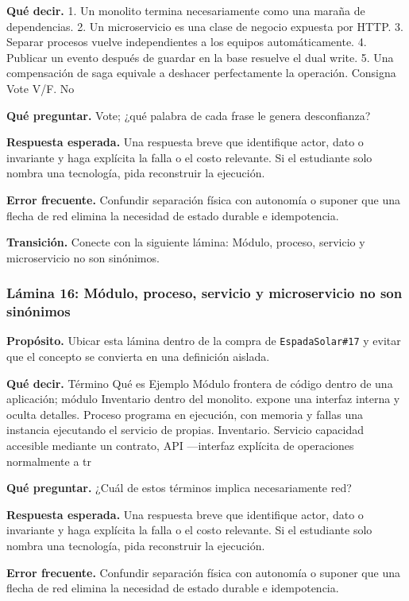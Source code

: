 \documentclass[variant=docente,cover=institutional,mode=screen]{ua-engineering-v6-article}
\begin{document}
\textbf{Qué decir.} 1. Un monolito termina necesariamente como una maraña de dependencias. 2. Un microservicio es una clase de negocio expuesta por HTTP. 3. Separar procesos vuelve independientes a los equipos automáticamente. 4. Publicar un evento después de guardar en la base resuelve el dual write. 5. Una compensación de saga equivale a deshacer perfectamente la operación. Consigna Vote V/F. No

\textbf{Qué preguntar.} Vote; ¿qué palabra de cada frase le genera desconfianza?

\textbf{Respuesta esperada.} Una respuesta breve que identifique actor, dato o invariante y haga explícita la falla o el costo relevante. Si el estudiante solo nombra una tecnología, pida reconstruir la ejecución.

\textbf{Error frecuente.} Confundir separación física con autonomía o suponer que una flecha de red elimina la necesidad de estado durable e idempotencia.

\textbf{Transición.} Conecte con la siguiente lámina: Módulo, proceso, servicio y microservicio no son sinónimos.

\subsubsection*{Lámina 16: Módulo, proceso, servicio y microservicio no son sinónimos}
\textbf{Propósito.} Ubicar esta lámina dentro de la compra de \texttt{EspadaSolar\#17} y evitar que el concepto se convierta en una definición aislada.

\textbf{Qué decir.} Término Qué es Ejemplo Módulo frontera de código dentro de una aplicación; módulo Inventario dentro del monolito. expone una interfaz interna y oculta detalles. Proceso programa en ejecución, con memoria y fallas una instancia ejecutando el servicio de propias. Inventario. Servicio capacidad accesible mediante un contrato, API —interfaz explícita de operaciones normalmente a tr

\textbf{Qué preguntar.} ¿Cuál de estos términos implica necesariamente red?

\textbf{Respuesta esperada.} Una respuesta breve que identifique actor, dato o invariante y haga explícita la falla o el costo relevante. Si el estudiante solo nombra una tecnología, pida reconstruir la ejecución.

\textbf{Error frecuente.} Confundir separación física con autonomía o suponer que una flecha de red elimina la necesidad de estado durable e idempotencia.
\end{document}

